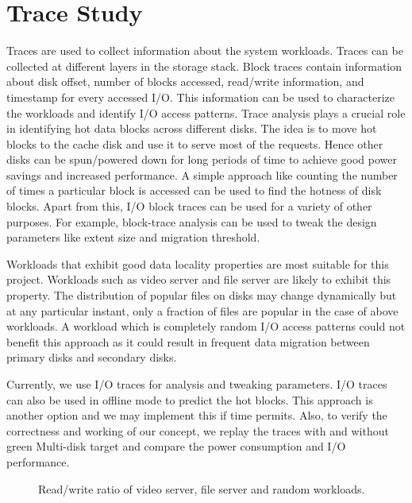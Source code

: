 \section{Trace Study}
\label{sec:trace}

Traces are used to collect information about the system workloads.
Traces can be collected at different layers in the storage stack.
Block traces contain information about disk offset, number of blocks
accessed, read/write information, and timestamp for every accessed
I/O.  This information can be used to characterize the workloads and
identify I/O access patterns.  Trace analysis plays a crucial role in
identifying hot data blocks across different disks. The idea is to
move hot blocks to the cache disk and use it to serve most of the
requests. Hence other disks can be spun/powered down for long periods
of time to achieve good power savings and increased performance. A
simple approach like counting the number of times a particular block
is accessed can be used to find the hotness of disk blocks. Apart from
this, I/O block traces can be used for a variety of other purposes.
For example, block-trace analysis can be used to tweak the design
parameters like extent size and migration threshold.

Workloads that exhibit good data locality properties are most suitable
for this project. Workloads such as video server and file server are
likely to exhibit this property. The distribution of popular files on
disks may change dynamically but at any particular instant, only a
fraction of files are popular in the case of above workloads. A
workload which is completely random I/O access patterns could not
benefit this approach as it could result in frequent data migration
between primary disks and secondary disks.
 
Currently, we use I/O traces for analysis and tweaking parameters. I/O
traces can also be used in offline mode to predict the hot blocks.
This approach is another option and we may implement this if time
permits. Also, to verify the correctness and working of our concept,
we replay the traces with and without green Multi-disk target and
compare the power consumption and I/O performance. 

\begin{figure}[ht]
\begin{centering}
\caption{Read/write ratio of video server, file server and random
  workloads.}
\label{fig:rwratio}
\end{centering}
\end{figure}

